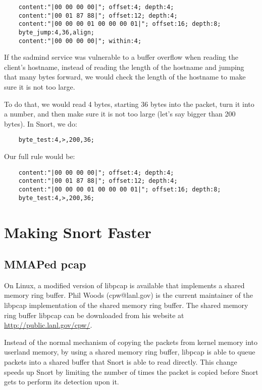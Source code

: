 \documentclass[english]{report}
\begin{document}
\begin{verbatim}
    content:"|00 00 00 00|"; offset:4; depth:4;
    content:"|00 01 87 88|"; offset:12; depth:4;
    content:"|00 00 00 01 00 00 00 01|"; offset:16; depth:8;
    byte_jump:4,36,align;
    content:"|00 00 00 00|"; within:4;
\end{verbatim}

If the sadmind service was vulnerable to a buffer overflow when reading the
client's hostname, instead of reading the length of the hostname and jumping
that many bytes forward, we would check the length of the hostname to make sure
it is not too large.  

To do that, we would read 4 bytes, starting 36 bytes into the packet, turn it
into a number, and then make sure it is not too large (let's say bigger than
200 bytes).  In Snort, we do: 

\begin{verbatim}
    byte_test:4,>,200,36;
\end{verbatim}
    
Our full rule would be:    

\begin{verbatim}
    content:"|00 00 00 00|"; offset:4; depth:4;
    content:"|00 01 87 88|"; offset:12; depth:4;
    content:"|00 00 00 01 00 00 00 01|"; offset:16; depth:8;
    byte_test:4,>,200,36;
\end{verbatim}

\chapter{Making Snort Faster}

\section{MMAPed pcap}

On Linux, a modified version of libpcap is available that implements a shared
memory ring buffer.  Phil Woods (cpw@lanl.gov) is the current maintainer of the
libpcap implementation of the shared memory ring buffer.  The shared memory
ring buffer libpcap can be downloaded from his website at
\url{http://public.lanl.gov/cpw/}.

Instead of the normal mechanism of copying the packets from kernel memory into
userland memory, by using a shared memory ring buffer, libpcap is able to queue
packets into a shared buffer that Snort is able to read directly.  This change
speeds up Snort by limiting the number of times the packet is copied before
Snort gets to perform its detection upon it.
\end{document}
